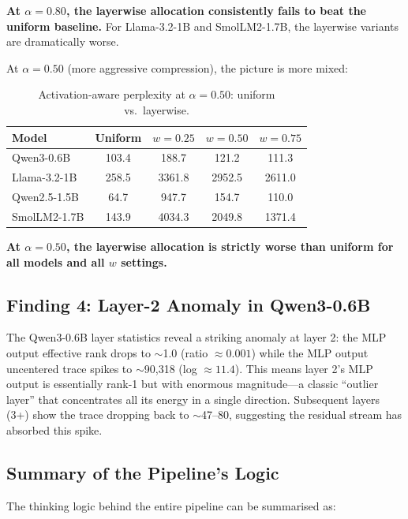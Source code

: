 \documentclass[11pt]{article}
\begin{document}
\noindent\textbf{At $\alpha = 0.80$, the layerwise allocation consistently fails to beat the uniform baseline.}  For Llama-3.2-1B and SmolLM2-1.7B, the layerwise variants are dramatically worse.

At $\alpha = 0.50$ (more aggressive compression), the picture is more mixed:

\begin{table}[H]
\centering
\caption{Activation-aware perplexity at $\alpha=0.50$: uniform vs.\ layerwise.}
\begin{tabular}{lcccc}
\toprule
\textbf{Model} & \textbf{Uniform} & \textbf{$w{=}0.25$} & \textbf{$w{=}0.50$} & \textbf{$w{=}0.75$} \\
\midrule
Qwen3-0.6B   & 103.4 & 188.7 & 121.2 & 111.3 \\
Llama-3.2-1B & 258.5 & 3361.8 & 2952.5 & 2611.0 \\
Qwen2.5-1.5B & 64.7 & 947.7 & 154.7 & 110.0 \\
SmolLM2-1.7B & 143.9 & 4034.3 & 2049.8 & 1371.4 \\
\bottomrule
\end{tabular}
\end{table}

\noindent\textbf{At $\alpha = 0.50$, the layerwise allocation is strictly worse than uniform for all models and all $w$ settings.}

\subsection{Finding 4: Layer-2 Anomaly in Qwen3-0.6B}

The Qwen3-0.6B layer statistics reveal a striking anomaly at layer 2: the MLP output effective rank drops to $\sim$1.0 (ratio $\approx 0.001$) while the MLP output uncentered trace spikes to $\sim$90{,}318 (log $\approx 11.4$).  This means layer 2's MLP output is essentially rank-1 but with enormous magnitude---a classic ``outlier layer'' that concentrates all its energy in a single direction.  Subsequent layers (3+) show the trace dropping back to $\sim$47--80, suggesting the residual stream has absorbed this spike.

\subsection{Summary of the Pipeline's Logic}

The thinking logic behind the entire pipeline can be summarised as:
\end{document}
